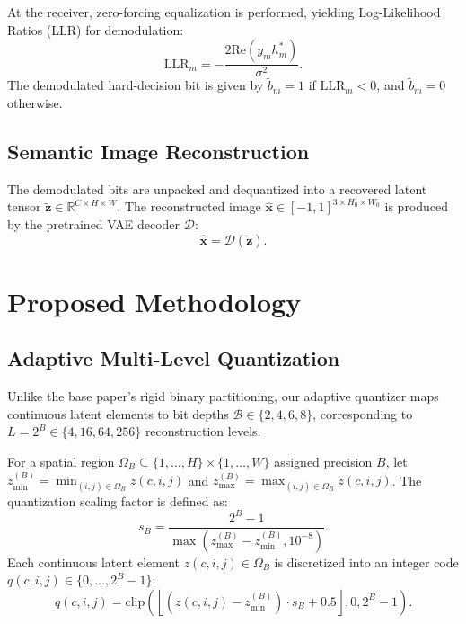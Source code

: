 \documentclass[journal,twocolumn]{IEEEtran}
\begin{document}
At the receiver, zero-forcing equalization is performed, yielding Log-Likelihood Ratios (LLR) for demodulation:
\begin{equation}
\text{LLR}_m = -\frac{2 \text{Re}(y_m h_m^*)}{\sigma^2}.
\label{eq:llr_formula}
\end{equation}
The demodulated hard-decision bit is given by $\tilde{b}_m = 1$ if $\text{LLR}_m < 0$, and $\tilde{b}_m = 0$ otherwise.

\subsection{Semantic Image Reconstruction}
The demodulated bits are unpacked and dequantized into a recovered latent tensor $\tilde{\mathbf{z}} \in \mathbb{R}^{C \times H \times W}$. The reconstructed image $\hat{\mathbf{x}} \in [-1, 1]^{3 \times H_0 \times W_0}$ is produced by the pretrained VAE decoder $\mathcal{D}$:
\begin{equation}
\hat{\mathbf{x}} = \mathcal{D}(\tilde{\mathbf{z}}).
\label{eq:vae_decode}
\end{equation}

\section{Proposed Methodology}
\subsection{Adaptive Multi-Level Quantization}
Unlike the base paper's rigid binary partitioning, our adaptive quantizer maps continuous latent elements to bit depths $\mathcal{B} \in \{2, 4, 6, 8\}$, corresponding to $L = 2^B \in \{4, 16, 64, 256\}$ reconstruction levels.

For a spatial region $\Omega_B \subseteq \{1,\dots,H\} \times \{1,\dots,W\}$ assigned precision $B$, let $z_{\min}^{(B)} = \min_{(i,j) \in \Omega_B} z(c,i,j)$ and $z_{\max}^{(B)} = \max_{(i,j) \in \Omega_B} z(c,i,j)$. The quantization scaling factor is defined as:
\begin{equation}
s_B = \frac{2^B - 1}{\max\left(z_{\max}^{(B)} - z_{\min}^{(B)}, 10^{-8}\right)}.
\label{eq:quant_scale}
\end{equation}
Each continuous latent element $z(c,i,j) \in \Omega_B$ is discretized into an integer code $q(c,i,j) \in \{0, \dots, 2^B - 1\}$:
\begin{equation}
q(c,i,j) = \text{clip}\left(\left\lfloor (z(c,i,j) - z_{\min}^{(B)}) \cdot s_B + 0.5 \right\rfloor, 0, 2^B - 1\right).
\label{eq:quant_discretize}
\end{equation}
\end{document}

